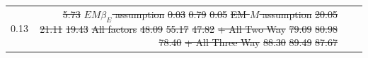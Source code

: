 \documentclass[
  12pt,
]{article}
\makeatletter
\providecommand{\DIFdel}[1]{{\protect\color{red}\sout{#1}}} %
\providecommand{\DIFdelFL}[1]{\DIFdel{#1}} %
\providecommand{\DIFdelbeginFL}{} %
\providecommand{\DIFdelendFL}{} %
\providecommand{\DIFscaledelfig}{0.5}
\newlength{\DIFdelgraphicswidth} %
\newlength{\DIFdelgraphicsheight} %
\providecommand{\DIFdelincludegraphics}[2][]{%
\sbox{\DIFdelgraphicsbox}{\DIFOincludegraphics[#1]{#2}}%
\settoboxwidth{\DIFdelgraphicswidth}{\DIFdelgraphicsbox} %
\settoboxtotalheight{\DIFdelgraphicsheight}{\DIFdelgraphicsbox} %
\scalebox{\DIFscaledelfig}{%
\parbox[b]{\DIFdelgraphicswidth}{\usebox{\DIFdelgraphicsbox}\\[-\baselineskip] \rule{\DIFdelgraphicswidth}{0em}}\llap{\resizebox{\DIFdelgraphicswidth}{\DIFdelgraphicsheight}{%
\setlength{\unitlength}{\DIFdelgraphicswidth}%
\begin{picture}(1,1)%
\thicklines\linethickness{2pt} %
{\color[rgb]{1,0,0}\put(0,0){\framebox(1,1){}}}%
{\color[rgb]{1,0,0}\put(0,0){\line( 1,1){1}}}%
{\color[rgb]{1,0,0}\put(0,1){\line(1,-1){1}}}%
\end{picture}%
}\hspace*{3pt}}} %
} %
\DeclareRobustCommand{\DIFdelbeginFL}{\DIFOdelbeginFL \let\includegraphics\DIFdelincludegraphics} %
\DeclareRobustCommand{\DIFdelendFL}{\DIFOaddendFL \let\includegraphics\DIFOincludegraphics} %
\let\sout@orig\sout %
\renewcommand{\sout}[1]{\ifmmode\text{\sout@orig{\ensuremath{#1}}}\else\sout@orig{#1}\fi} %
\makeatother
\begin{document}
\begin{table}
{\begin{center}
\begin{tabular}{lrrr}
\DIFdelendFL 0.13&\DIFdelbeginFL \DIFdelFL{5.73}%
\DIFdelFL{$EM \beta_{E}$ assumption}%
\DIFdelFL{0.03}%
\DIFdelFL{0.79}%
\DIFdelFL{0.05}%
\DIFdelFL{EM $M$ assumption}%
\DIFdelFL{20.05}%
\DIFdelFL{21.11}%
\DIFdelFL{19.43}%
\DIFdelFL{All factors}%
\DIFdelFL{48.09}%
\DIFdelFL{55.17}%
\DIFdelFL{47.82}%
\DIFdelFL{+ All Two Way}%
\DIFdelFL{79.09}%
\DIFdelFL{80.98}%
\DIFdelFL{78.40}%
\DIFdelFL{+ All Three Way}%
\DIFdelFL{88.30}%
\DIFdelFL{89.49}%
\DIFdelFL{87.67}%


\end{tabular}
\end{center}}
\end{table}
\end{document}
